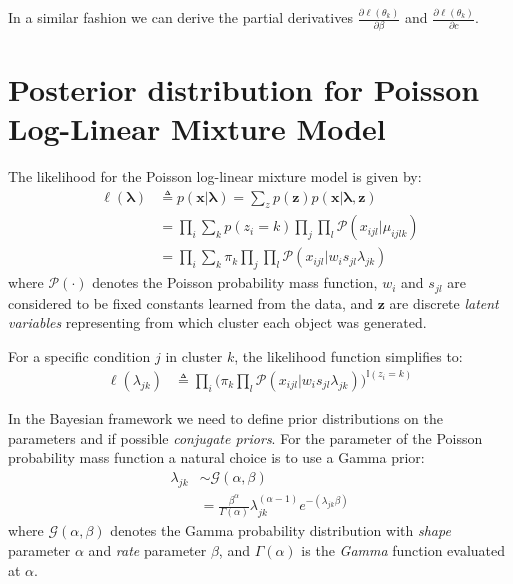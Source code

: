 In a similar fashion we can derive the partial derivatives $\frac{\partial \ell(\theta_{k})}{\partial \beta}$ and $\frac{\partial \ell(\theta_{k})}{\partial c}$.




\section{Posterior distribution for Poisson Log-Linear Mixture Model}

The likelihood for the Poisson log-linear mixture model is given by:
\begin{equation} \label{poisson-log-lin-mm-app}
  \begin{split}
	\ell(\mathbf{\lambda}) & \triangleq p(\mathbf{x} | \mathbf{\lambda}) = \sum\limits_{z} p(\mathbf{z}) p(\mathbf{x} | \mathbf{\lambda}, \mathbf{z})\\
		& = \prod_{i} \sum_{k} p(z_{i} = k) \prod_{j} \prod_{l} \mathcal{P}(x_{ijl} | \mu_{ijlk}) \\
		& = \prod_{i} \sum_{k} \pi_{k} \prod_{j} \prod_{l} \mathcal{P}(x_{ijl} | w_{i}s_{jl} \lambda_{jk})
  \end{split}
\end{equation}
where $\mathcal{P}(\cdot)$ denotes the Poisson probability mass function, $w_{i}$ and $s_{jl}$ are considered to be fixed constants learned from the data, and $\mathbf{z}$ are discrete \emph{latent variables} representing from which cluster each object was generated. 

For a specific condition $j$ in cluster $k$, the likelihood function simplifies to:
\begin{equation} \label{poisson-log-lin-mm-jk-app}
  \begin{split}
	\ell(\lambda_{jk}) & \triangleq \prod_{i} \bigg( \pi_{k} \prod_{l} \mathcal{P}(x_{ijl} | w_{i}s_{jl} \lambda_{jk})\bigg)^{\mathbb{I}(z_{i}=k)}
  \end{split}
\end{equation}

In the Bayesian framework we need to define prior distributions on the parameters and if possible \emph{conjugate priors}. For the parameter of the Poisson probability mass function a natural choice is to use a Gamma prior:
\begin{equation} \label{poisson-prior-mm-app}
  \begin{split}
  \lambda_{jk} & \sim \mathcal{G}(\alpha, \beta) \\
  	& = \frac{\beta^{\alpha}}{\Gamma(\alpha)}\lambda_{jk}^{(\alpha-1)} e^{-(\lambda_{jk}\beta)}
    \end{split}
\end{equation}
where $\mathcal{G}(\alpha, \beta)$ denotes the Gamma probability distribution with \emph{shape} parameter $\alpha$ and \emph{rate} parameter $\beta$, and $\Gamma(\alpha)$ is the \emph{Gamma} function evaluated at $\alpha$.

